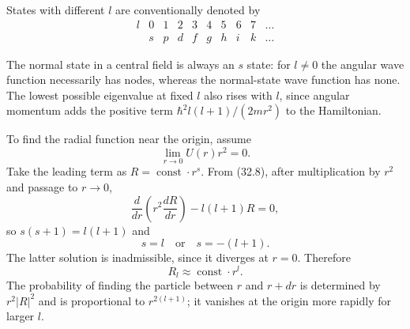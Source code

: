 States with different $l$ are conventionally denoted by
\begin{equation}
 \begin{array}{c|cccccccc|c}
 l&0&1&2&3&4&5&6&7&\ldots\\
  &s&p&d&f&g&h&i&k&\ldots
 \end{array}\tag{32.13}
\end{equation}

The normal state in a central field is always an $s$ state: for $l\ne0$ the
angular wave function necessarily has nodes, whereas the normal-state wave
function has none. The lowest possible eigenvalue at fixed $l$ also rises
with $l$, since angular momentum adds the positive term
$\hbar^2l(l+1)/(2mr^2)$ to the Hamiltonian.

To find the radial function near the origin, assume
\begin{equation}\lim_{r\to0}U(r)r^2=0.\tag{32.14}\end{equation}
Take the leading term as $R=\operatorname{const}\cdot r^s$. From (32.8),
after multiplication by $r^2$ and passage to $r\to0$,
\[\frac d{dr}\left(r^2\frac{dR}{dr}\right)-l(l+1)R=0,\]
so $s(s+1)=l(l+1)$ and
\[s=l\quad\text{or}\quad s=-(l+1).\]
The latter solution is inadmissible, since it diverges at $r=0$. Therefore
\begin{equation}R_l\approx\operatorname{const}\cdot r^l.\tag{32.15}\end{equation}
The probability of finding the particle between $r$ and $r+dr$ is determined
by $r^2|R|^2$ and is proportional to $r^{2(l+1)}$; it vanishes at the origin
more rapidly for larger $l$.

